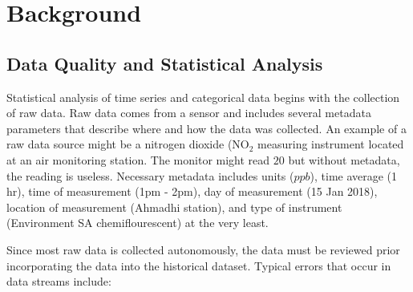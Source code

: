 \chapter{Background}

\section{Data Quality and Statistical Analysis}

Statistical analysis of time series and categorical data begins with the collection of raw data. Raw data comes from a sensor and includes several metadata parameters that describe where and how the data was collected. An example of a raw data source might be a nitrogen dioxide (NO$_{2}$ measuring instrument located at an air monitoring station. The monitor might read $20$ but without metadata, the reading is useless. Necessary metadata includes units ($ppb$), time average (1 hr), time of measurement (1pm - 2pm), day of measurement (15 Jan 2018), location of measurement (Ahmadhi station), and type of instrument (Environment SA chemiflourescent) at the very least.

Since most raw data is collected autonomously, the data must be reviewed prior incorporating the data into the historical dataset. Typical errors that occur in data streams include:

